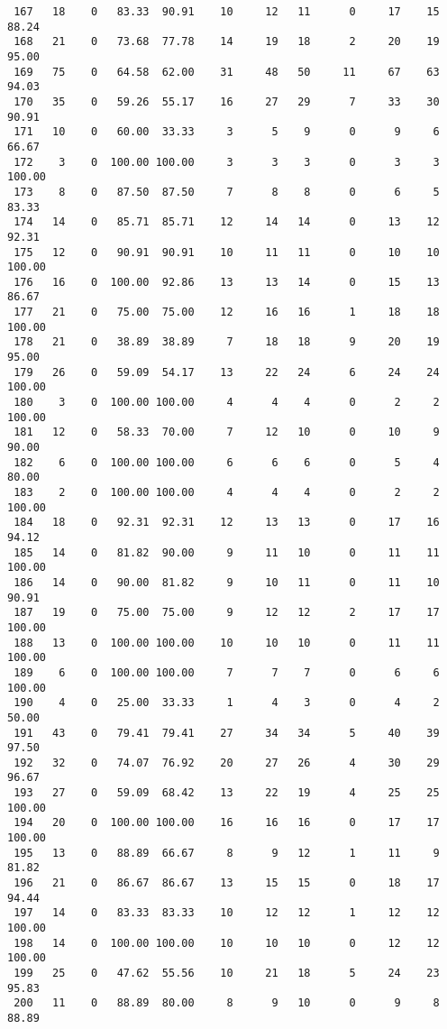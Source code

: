 \begin{verbatim}
 167   18    0   83.33  90.91    10     12   11      0     17    15    88.24
 168   21    0   73.68  77.78    14     19   18      2     20    19    95.00
 169   75    0   64.58  62.00    31     48   50     11     67    63    94.03
 170   35    0   59.26  55.17    16     27   29      7     33    30    90.91
 171   10    0   60.00  33.33     3      5    9      0      9     6    66.67
 172    3    0  100.00 100.00     3      3    3      0      3     3   100.00
 173    8    0   87.50  87.50     7      8    8      0      6     5    83.33
 174   14    0   85.71  85.71    12     14   14      0     13    12    92.31
 175   12    0   90.91  90.91    10     11   11      0     10    10   100.00
 176   16    0  100.00  92.86    13     13   14      0     15    13    86.67
 177   21    0   75.00  75.00    12     16   16      1     18    18   100.00
 178   21    0   38.89  38.89     7     18   18      9     20    19    95.00
 179   26    0   59.09  54.17    13     22   24      6     24    24   100.00
 180    3    0  100.00 100.00     4      4    4      0      2     2   100.00
 181   12    0   58.33  70.00     7     12   10      0     10     9    90.00
 182    6    0  100.00 100.00     6      6    6      0      5     4    80.00
 183    2    0  100.00 100.00     4      4    4      0      2     2   100.00
 184   18    0   92.31  92.31    12     13   13      0     17    16    94.12
 185   14    0   81.82  90.00     9     11   10      0     11    11   100.00
 186   14    0   90.00  81.82     9     10   11      0     11    10    90.91
 187   19    0   75.00  75.00     9     12   12      2     17    17   100.00
 188   13    0  100.00 100.00    10     10   10      0     11    11   100.00
 189    6    0  100.00 100.00     7      7    7      0      6     6   100.00
 190    4    0   25.00  33.33     1      4    3      0      4     2    50.00
 191   43    0   79.41  79.41    27     34   34      5     40    39    97.50
 192   32    0   74.07  76.92    20     27   26      4     30    29    96.67
 193   27    0   59.09  68.42    13     22   19      4     25    25   100.00
 194   20    0  100.00 100.00    16     16   16      0     17    17   100.00
 195   13    0   88.89  66.67     8      9   12      1     11     9    81.82
 196   21    0   86.67  86.67    13     15   15      0     18    17    94.44
 197   14    0   83.33  83.33    10     12   12      1     12    12   100.00
 198   14    0  100.00 100.00    10     10   10      0     12    12   100.00
 199   25    0   47.62  55.56    10     21   18      5     24    23    95.83
 200   11    0   88.89  80.00     8      9   10      0      9     8    88.89

\end{verbatim}
